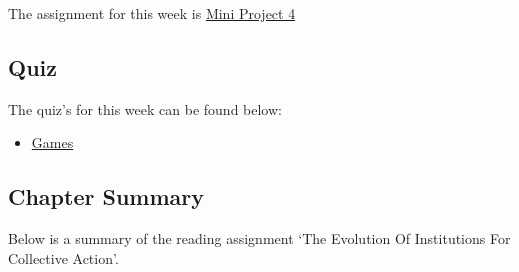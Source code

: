 The assignment for this week is \href{https://applied.cs.colorado.edu/mod/assign/view.php?id=49425}{Mini Project 4}  

\subsection{Quiz}

The quiz's for this week can be found below:

\begin{itemize}
    \item \href{https://applied.cs.colorado.edu/mod/quiz/view.php?id=49423}{Games}  
\end{itemize}

\subsection{Chapter Summary}

Below is a summary of the reading assignment `The Evolution Of Institutions For Collective Action'.

